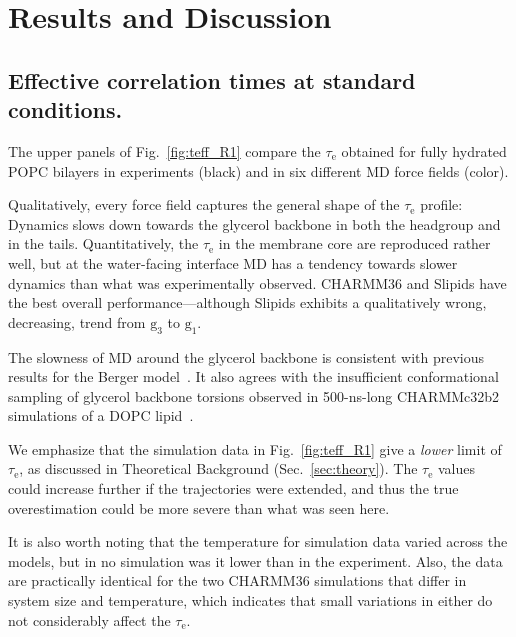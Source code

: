 \documentclass[journal=jpcbfk,manuscript=article,layout=twocolumn]{achemso}
\begin{document}

\section{Results and Discussion}
\subsection*{Effective correlation times at standard conditions.}
The upper panels of Fig.~\ref{fig:teff_R1} compare the $\tau_\mathrm{e}$ obtained for fully hydrated POPC bilayers in experiments (black) and in six different MD force fields (color).

Qualitatively, every force field captures the general shape of the $\tau_\mathrm{e}$ profile: Dynamics slows down towards the glycerol backbone in both the headgroup and in the tails. Quantitatively, the $\tau_\mathrm{e}$ in the membrane core are reproduced rather well, but at the water-facing interface MD has a tendency towards slower dynamics than what was experimentally observed.
CHARMM36 and Slipids have the best overall performance---although Slipids exhibits a qualitatively wrong, decreasing, trend from $\mathrm g_{3}$ to $\mathrm g_{1}$. 

The slowness of MD around the glycerol backbone is consistent with previous results for the Berger model~\cite{ferreira15}. It also agrees with the insufficient conformational sampling of glycerol backbone torsions observed in 500-ns-long CHARMMc32b2~\cite{schlenkrich96,feller00} simulations of a DOPC lipid~\cite{vogel12}. %

We emphasize that the simulation data in Fig.~\ref{fig:teff_R1} give a \emph{lower} limit of $\tau_\mathrm{e}$, as discussed in Theoretical Background (Sec.~\ref{sec:theory}). The $\tau_\mathrm{e}$ values could increase further if the trajectories were extended, and thus the true overestimation could be more severe than what was seen here.

It is also worth noting that the temperature for simulation data varied across the models, but in no simulation was it lower than in the experiment. %
Also, the data are practically identical for the two CHARMM36 simulations that differ in system size and temperature, which indicates that small variations in either do not considerably affect the $\tau_\mathrm{e}$.
\end{document}
